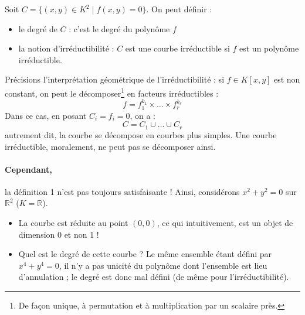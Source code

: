 \documentclass[a4paper, 11pt]{article}
\theoremstyle{definition}
\newcommand{\real}{\mathbb{R}}
\begin{document}
Soit $C = \{(x,y)\in K^2 \mid f(x,y)=0\}$. On peut définir :
\begin{itemize}
\item le degré de $C$ : c'est le degré du polynôme $f$
\item la notion d'irréductibilité : $C$ est une courbe irréductible si
  $f$ est un polynôme irréductible.
\end{itemize}
Précisions l'interprétation géométrique de l'irréductibilité : si
$f \in K[x,y]$ est non constant, on peut le décomposer\footnote{De
  façon unique, à permutation et à multiplication par un scalaire
  près.} en facteurs irréductibles :
\[ f = f_1^{k_1} \times \ldots \times f_r^{k_r} \]
Dans ce cas, en posant $C_i = {f_i = 0}$, on a :
\[ C = C_1 \cup \ldots \cup C_r \]
autrement dit, la courbe se décompose en courbes plus simples. Une
courbe irréductible, moralement, ne peut pas se décomposer ainsi.

\paragraph{Cependant,} la définition 1 n'est pas toujours satisfaisante !
Ainsi, considérons $x^2 + y^2 = 0$ sur $\real^2$ ($K = \real$).
\begin{itemize}
\item La courbe est réduite au point $(0,0)$, ce qui intuitivement,
  est un objet de dimension 0 et non 1 !
\item Quel est le degré de cette courbe ? Le même ensemble étant
  défini par $x^4 + y^4 = 0$, il n'y a pas unicité du polynôme dont
  l'ensemble est lieu d'annulation ; le degré est donc mal défini (de
  même pour l'irréductibilité).
\end{itemize}
\end{document}
